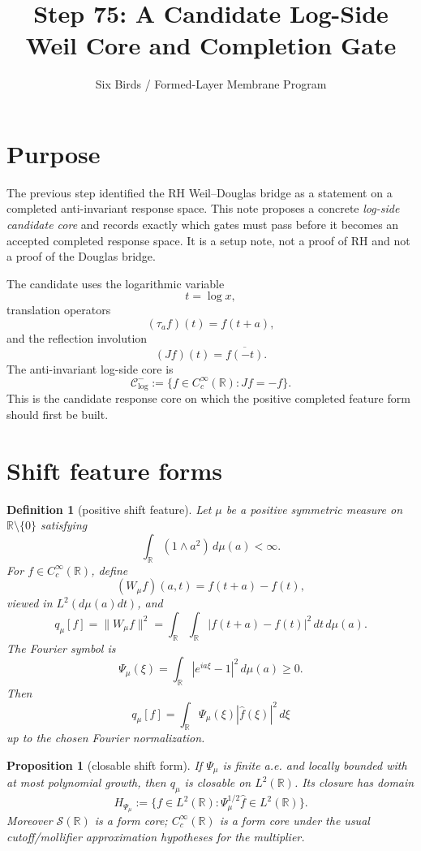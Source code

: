 \documentclass[11pt]{article}
\title{Step 75: A Candidate Log-Side Weil Core and Completion Gate}
\author{Six Birds / Formed-Layer Membrane Program}
\date{}
\newtheorem{proposition}{Proposition}
\newtheorem{definition}{Definition}
\newcommand{\R}{\mathbb R}
\begin{document}
\maketitle

\section{Purpose}
The previous step identified the RH Weil--Douglas bridge as a statement on a completed anti-invariant response space.  This note proposes a concrete \emph{log-side candidate core} and records exactly which gates must pass before it becomes an accepted completed response space.  It is a setup note, not a proof of RH and not a proof of the Douglas bridge.

The candidate uses the logarithmic variable
\[
  t=\log x,
\]
translation operators
\[
  (\tau_a f)(t)=f(t+a),
\]
and the reflection involution
\[
  (Jf)(t)=\overline{f(-t)}.
\]
The anti-invariant log-side core is
\[
  \mathcal C^-_{\log}:=\{f\in C_c^\infty(\R):Jf=-f\}.
\]
This is the candidate response core on which the positive completed feature form should first be built.

\section{Shift feature forms}
\begin{definition}[positive shift feature]
Let \(\mu\) be a positive symmetric measure on \(\R\setminus\{0\}\) satisfying
\[
  \int_{\R}(1\wedge a^2)\,d\mu(a)<\infty.
\]
For \(f\in C_c^\infty(\R)\), define
\[
  (W_\mu f)(a,t)=f(t+a)-f(t),
\]
viewed in \(L^2(d\mu(a)dt)\), and
\[
  q_\mu[f]=\|W_\mu f\|^2
  =\int_\R\int_\R |f(t+a)-f(t)|^2\,dt\,d\mu(a).
\]
The Fourier symbol is
\[
  \Psi_\mu(\xi)=\int_\R |e^{ia\xi}-1|^2\,d\mu(a)\ge0.
\]
Then
\[
  q_\mu[f]=\int_\R \Psi_\mu(\xi)|\widehat f(\xi)|^2\,d\xi
\]
up to the chosen Fourier normalization.
\end{definition}

\begin{proposition}[closable shift form]
If \(\Psi_\mu\) is finite a.e. and locally bounded with at most polynomial growth, then \(q_\mu\) is closable on \(L^2(\R)\).  Its closure has domain
\[
  H_{\Psi_\mu}:=\{f\in L^2(\R):\Psi_\mu^{1/2}\widehat f\in L^2(\R)\}.
\]
Moreover \(\mathcal S(\R)\) is a form core; \(C_c^\infty(\R)\) is a form core under the usual cutoff/mollifier approximation hypotheses for the multiplier.
\end{proposition}
\end{document}

